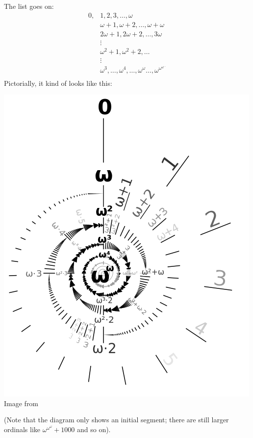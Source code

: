 The list goes on:
\[
\begin{aligned}
	0, & 1, 2, 3, \dots, \omega \\
	& \omega+1, \omega+2, \dots, \omega+\omega \\
	& 2\omega+1, 2\omega+2, \dots, 3\omega \\
	& \vdots \\
	& \omega^2 + 1, \omega^2+2, \dots \\
	& \vdots \\
	& \omega^3, \dots, \omega^4, \dots, \omega^\omega
	\dots, \omega^{\omega^{\omega^{\dots}}} \\
\end{aligned}
\]
Pictorially, it kind of looks like this:
\begin{center}
	\includegraphics[scale=0.70]{media/500px-Omega-exp-omega-labeled.png}
	\\ \scriptsize Image from \cite{img:omega500}
\end{center}
(Note that the diagram only shows an initial segment;
there are still larger ordinals like $\omega^{\omega^{\omega}}+1000$ and so on).

